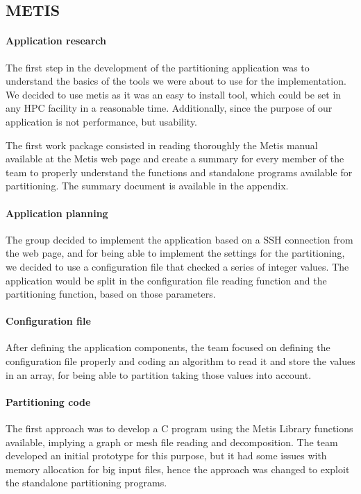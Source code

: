 \documentclass{cranfieldChart}
\begin{document}
\subsection{METIS}

\paragraph{Application research}
The first step in the development of the partitioning application was to understand the basics of the tools we were about to use for the implementation. We decided to use metis as it was an easy to install tool, which could be set in any HPC facility in a reasonable time. Additionally, since the purpose of our application is not performance, but usability.

The first work package consisted in reading thoroughly the Metis manual available at the Metis web page and create a summary for every member of the team to properly understand the functions and standalone programs available for partitioning. The summary document is available in the appendix.

\paragraph{Application planning}
The group decided to implement the application based on a SSH connection from the web page, and for being able to implement the settings for the partitioning, we decided to use a configuration file that checked a series of integer values. The application would be split in the configuration file reading function and the partitioning function, based on those parameters.

\paragraph{Configuration file}
After defining the application components, the team focused on defining the configuration file properly and coding an algorithm to read it and store the values in an array, for being able to partition taking those values into account.

\paragraph{Partitioning code}
The first approach was to develop a C program using the Metis Library functions available, implying a graph or mesh file reading and decomposition. The team developed an initial prototype for this purpose, but it had some issues with memory allocation for big input files, hence the approach was changed to exploit the standalone partitioning programs.
\end{document}

